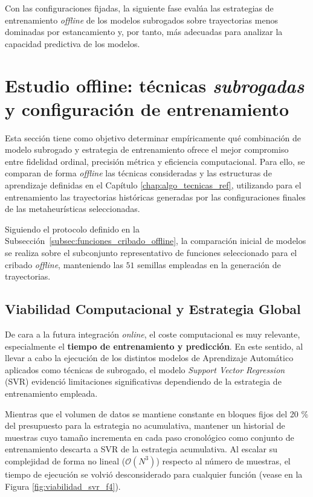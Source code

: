 Con las configuraciones fijadas, la siguiente fase evalúa las estrategias de entrenamiento \textit{offline} de los modelos subrogados sobre trayectorias menos dominadas por estancamiento y, por tanto, más adecuadas para analizar la capacidad predictiva de los modelos.

\section{Estudio offline: técnicas \textit{subrogadas} y configuración de entrenamiento}
\label{sec:estudio_offline}


Esta sección tiene como objetivo determinar empíricamente qué combinación de modelo subrogado y estrategia de entrenamiento ofrece el mejor compromiso entre fidelidad ordinal, precisión métrica y eficiencia computacional. Para ello, se comparan de forma \textit{offline} las técnicas consideradas y las estructuras de aprendizaje definidas en el Capítulo \ref{chap:algo_tecnicas_ref}, utilizando para el entrenamiento las trayectorias históricas generadas por las configuraciones finales de las metaheurísticas seleccionadas.

Siguiendo el protocolo definido en la
Subsección~\ref{subsec:funciones_cribado_offline}, la comparación inicial de modelos se realiza sobre el subconjunto representativo de funciones seleccionado para el cribado \textit{offline}, manteniendo las \(51\) semillas empleadas en la generación de trayectorias.

\subsection{Viabilidad Computacional y Estrategia Global}
\label{subsec:viabilidad_estrategia_global}

De cara a la futura integración \textit{online}, el coste computacional es muy relevante, especialmente el \textbf{tiempo de entrenamiento y predicción}. En este sentido, al llevar a cabo la ejecución de los distintos modelos de Aprendizaje Automático aplicados como técnicas de subrogado, el modelo \textit{Support Vector Regression} (SVR) evidenció limitaciones significativas dependiendo de la estrategia de entrenamiento empleada.

Mientras que el volumen de datos se mantiene constante en bloques fijos del 20 \% del presupuesto para la estrategia no acumulativa, mantener un historial de muestras cuyo tamaño incrementa en cada paso cronológico como conjunto de entrenamiento descarta a SVR de la estrategia acumulativa. Al escalar su complejidad de forma no lineal ($\mathcal{O}(N^3)$) respecto al número de muestras, el tiempo de ejecución se volvió desconsiderado para cualquier función (vease en la Figura \ref{fig:viabilidad_svr_f4}).


